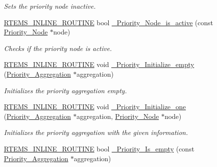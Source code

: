 \begin{DoxyCompactItemize}
\begin{DoxyCompactList}\small\item\em Sets the priority node inactive. \end{DoxyCompactList}\item 
\mbox{\hyperlink{group__RTEMSScoreBaseDefs_gac216239df231d5dbd15e3520b0b9313f}{R\+T\+E\+M\+S\+\_\+\+I\+N\+L\+I\+N\+E\+\_\+\+R\+O\+U\+T\+I\+NE}} bool \mbox{\hyperlink{group__RTEMSScorePriority_ga3b20401cbb459264526c37edc5b1c89f}{\+\_\+\+Priority\+\_\+\+Node\+\_\+is\+\_\+active}} (const \mbox{\hyperlink{structPriority__Node}{Priority\+\_\+\+Node}} $\ast$node)
\begin{DoxyCompactList}\small\item\em Checks if the priority node is active. \end{DoxyCompactList}\item 
\mbox{\hyperlink{group__RTEMSScoreBaseDefs_gac216239df231d5dbd15e3520b0b9313f}{R\+T\+E\+M\+S\+\_\+\+I\+N\+L\+I\+N\+E\+\_\+\+R\+O\+U\+T\+I\+NE}} void \mbox{\hyperlink{group__RTEMSScorePriority_ga8d8c4f07bd22c4dd27a592368fadedcf}{\+\_\+\+Priority\+\_\+\+Initialize\+\_\+empty}} (\mbox{\hyperlink{structPriority__Aggregation}{Priority\+\_\+\+Aggregation}} $\ast$aggregation)
\begin{DoxyCompactList}\small\item\em Initializes the priority aggregation empty. \end{DoxyCompactList}\item 
\mbox{\hyperlink{group__RTEMSScoreBaseDefs_gac216239df231d5dbd15e3520b0b9313f}{R\+T\+E\+M\+S\+\_\+\+I\+N\+L\+I\+N\+E\+\_\+\+R\+O\+U\+T\+I\+NE}} void \mbox{\hyperlink{group__RTEMSScorePriority_gac0c058cfd317fde243a7645b7a64b41c}{\+\_\+\+Priority\+\_\+\+Initialize\+\_\+one}} (\mbox{\hyperlink{structPriority__Aggregation}{Priority\+\_\+\+Aggregation}} $\ast$aggregation, \mbox{\hyperlink{structPriority__Node}{Priority\+\_\+\+Node}} $\ast$node)
\begin{DoxyCompactList}\small\item\em Initializes the priority aggregation with the given information. \end{DoxyCompactList}\item 
\mbox{\hyperlink{group__RTEMSScoreBaseDefs_gac216239df231d5dbd15e3520b0b9313f}{R\+T\+E\+M\+S\+\_\+\+I\+N\+L\+I\+N\+E\+\_\+\+R\+O\+U\+T\+I\+NE}} bool \mbox{\hyperlink{group__RTEMSScorePriority_ga0344d5313d3b010417b4c84ce5d45d42}{\+\_\+\+Priority\+\_\+\+Is\+\_\+empty}} (const \mbox{\hyperlink{structPriority__Aggregation}{Priority\+\_\+\+Aggregation}} $\ast$aggregation)

\end{DoxyCompactItemize}
